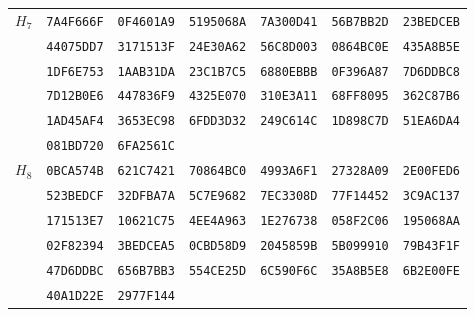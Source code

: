 \begin{table}
\begin{tabular}{@{}ccccccc@{}}
\midrule
\multirow{6}{*}{$H_{7}$}
 & \texttt{7A4F666F} & \texttt{0F4601A9} & \texttt{5195068A} & \texttt{7A300D41} & \texttt{56B7BB2D} & \texttt{23BEDCEB}\\
 & \texttt{44075DD7} & \texttt{3171513F} & \texttt{24E30A62} & \texttt{56C8D003} & \texttt{0864BC0E} & \texttt{435A8B5E}\\
 & \texttt{1DF6E753} & \texttt{1AAB31DA} & \texttt{23C1B7C5} & \texttt{6880EBBB} & \texttt{0F396A87} & \texttt{7D6DDBC8}\\
 & \texttt{7D12B0E6} & \texttt{447836F9} & \texttt{4325E070} & \texttt{310E3A11} & \texttt{68FF8095} & \texttt{362C87B6}\\
 & \texttt{1AD45AF4} & \texttt{3653EC98} & \texttt{6FDD3D32} & \texttt{249C614C} & \texttt{1D898C7D} & \texttt{51EA6DA4}\\
 & \texttt{081BD720} & \texttt{6FA2561C}\\

\midrule
\multirow{6}{*}{$H_{8}$}
 & \texttt{0BCA574B} & \texttt{621C7421} & \texttt{70864BC0} & \texttt{4993A6F1} & \texttt{27328A09} & \texttt{2E00FED6}\\
 & \texttt{523BEDCF} & \texttt{32DFBA7A} & \texttt{5C7E9682} & \texttt{7EC3308D} & \texttt{77F14452} & \texttt{3C9AC137}\\
 & \texttt{171513E7} & \texttt{10621C75} & \texttt{4EE4A963} & \texttt{1E276738} & \texttt{058F2C06} & \texttt{195068AA}\\
 & \texttt{02F82394} & \texttt{3BEDCEA5} & \texttt{0CBD58D9} & \texttt{2045859B} & \texttt{5B099910} & \texttt{79B43F1F}\\
 & \texttt{47D6DDBC} & \texttt{656B7BB3} & \texttt{554CE25D} & \texttt{6C590F6C} & \texttt{35A8B5E8} & \texttt{6B2E00FE}\\
 & \texttt{40A1D22E} & \texttt{2977F144}\\

\bottomrule
\end{tabular}
\end{table}

